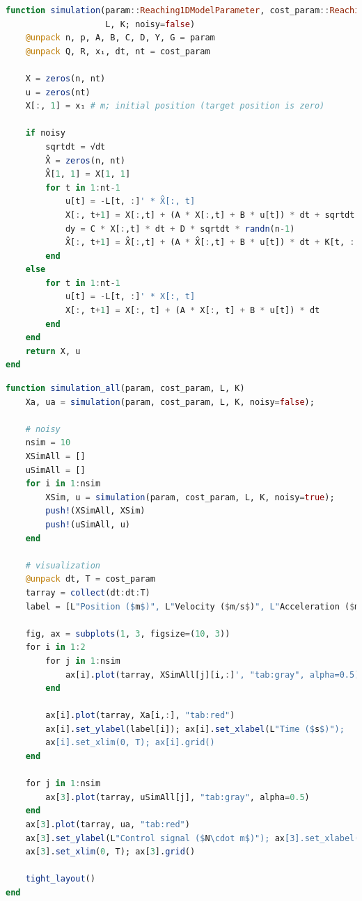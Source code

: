 \begin{lstlisting}[language=julia]
function simulation(param::Reaching1DModelParameter, cost_param::Reaching1DModelCostParameter, 
                    L, K; noisy=false)
    @unpack n, p, A, B, C, D, Y, G = param
    @unpack Q, R, x₁, dt, nt = cost_param
    
    X = zeros(n, nt)
    u = zeros(nt)
    X[:, 1] = x₁ # m; initial position (target position is zero)

    if noisy
        sqrtdt = √dt
        X̂ = zeros(n, nt)
        X̂[1, 1] = X[1, 1]
        for t in 1:nt-1
            u[t] = -L[t, :]' * X̂[:, t]
            X[:, t+1] = X[:,t] + (A * X[:,t] + B * u[t]) * dt + sqrtdt * (Y * u[t] * randn() + G * randn(n))
            dy = C * X[:,t] * dt + D * sqrtdt * randn(n-1)
            X̂[:, t+1] = X̂[:,t] + (A * X̂[:,t] + B * u[t]) * dt + K[t, :, :] * (dy - C * X̂[:,t] * dt)
        end
    else
        for t in 1:nt-1
            u[t] = -L[t, :]' * X[:, t]
            X[:, t+1] = X[:, t] + (A * X[:, t] + B * u[t]) * dt
        end
    end
    return X, u
end
\end{lstlisting}
\begin{lstlisting}[language=julia]
function simulation_all(param, cost_param, L, K)
    Xa, ua = simulation(param, cost_param, L, K, noisy=false);
    
    # noisy
    nsim = 10
    XSimAll = []
    uSimAll = []
    for i in 1:nsim
        XSim, u = simulation(param, cost_param, L, K, noisy=true);
        push!(XSimAll, XSim)
        push!(uSimAll, u)
    end
    
    # visualization
    @unpack dt, T = cost_param
    tarray = collect(dt:dt:T)
    label = [L"Position ($m$)", L"Velocity ($m/s$)", L"Acceleration ($m/s^2$)", L"Jerk ($m/s^3$)"]

    fig, ax = subplots(1, 3, figsize=(10, 3))
    for i in 1:2
        for j in 1:nsim
            ax[i].plot(tarray, XSimAll[j][i,:]', "tab:gray", alpha=0.5)
        end

        ax[i].plot(tarray, Xa[i,:], "tab:red")
        ax[i].set_ylabel(label[i]); ax[i].set_xlabel(L"Time ($s$)"); 
        ax[i].set_xlim(0, T); ax[i].grid()
    end

    for j in 1:nsim
        ax[3].plot(tarray, uSimAll[j], "tab:gray", alpha=0.5)
    end
    ax[3].plot(tarray, ua, "tab:red")
    ax[3].set_ylabel(L"Control signal ($N\cdot m$)"); ax[3].set_xlabel(L"Time ($s$)"); 
    ax[3].set_xlim(0, T); ax[3].grid()

    tight_layout()
end
\end{lstlisting}
